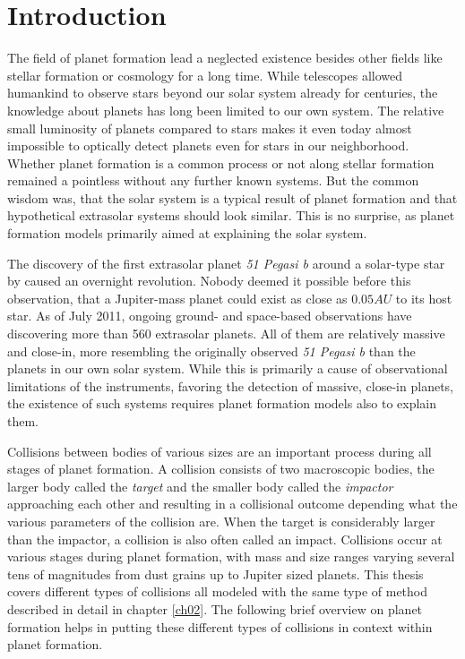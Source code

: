 \cleardoublepage
\chapter{Introduction}
\label{ch01}
\graphicspath{{./01figs/}}

The field of planet formation lead a neglected existence besides other fields like stellar formation or cosmology for a long time. While telescopes allowed humankind to observe stars beyond our solar system already for centuries, the knowledge about planets has long been limited to our own system. The relative small luminosity of planets compared to stars makes it even today almost impossible to optically detect planets even for stars in our neighborhood. Whether planet formation is a common process or not along stellar formation remained a pointless without any further known systems. But the common wisdom was, that the solar system is a typical result of planet formation and that hypothetical extrasolar systems should look similar. This is no surprise, as planet formation models primarily aimed at explaining the solar system.

The discovery of the first extrasolar planet \emph{51 Pegasi b} around a solar-type star by \cite{1995Natur.378..355M} caused an overnight revolution. Nobody deemed it possible before this observation, that a Jupiter-mass planet could exist as close as $0.05 AU$ to its host star. As of July 2011, ongoing ground- and space-based observations have discovering more than 560 extrasolar planets. All of them are relatively massive and close-in, more resembling the originally observed \emph{51 Pegasi b} than the planets in our own solar system. While this is primarily a cause of observational limitations of the instruments, favoring the detection of massive, close-in planets, the existence of such systems requires planet formation models also to explain them.

Collisions between bodies of various sizes are an important process during all stages of planet formation. A collision consists of two macroscopic bodies, the larger body called the \emph{target} and the smaller body called the \emph{impactor} approaching each other and resulting in a collisional outcome depending what the various parameters of the collision are. When the target is considerably larger than the impactor, a collision is also often called an impact. Collisions occur at various stages during planet formation, with mass and size ranges varying several tens of magnitudes from dust grains up to Jupiter sized planets. This thesis covers different types of collisions all modeled with the same type of method described in detail in chapter \ref{ch02}. The following brief overview on planet formation helps in putting these different types of collisions in context within planet formation.

